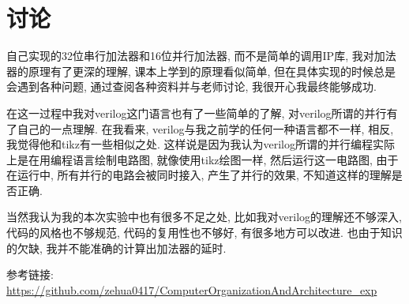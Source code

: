 \documentclass[AutoFakeBold]{LZUThesis}
\begin{document}
\section{讨论}
自己实现的32位串行加法器和16位并行加法器, 而不是简单的调用IP库, 我对加法器的原理有了更深的理解, 课本上学到的原理看似简单, 但在具体实现的时候总是会遇到各种问题, 
通过查阅各种资料并与老师讨论, 我很开心我最终能够成功.

在这一过程中我对verilog这门语言也有了一些简单的了解, 对verilog所谓的并行有了自己的一点理解. 
在我看来, verilog与我之前学的任何一种语言都不一样, 相反, 我觉得他和tikz有一些相似之处. 
这样说是因为我认为verilog所谓的并行编程实际上是在用编程语言绘制电路图, 就像使用tikz绘图一样,
然后运行这一电路图, 由于在运行中, 所有并行的电路会被同时接入, 产生了并行的效果, 不知道这样的理解是否正确.

当然我认为我的本次实验中也有很多不足之处, 比如我对verilog的理解还不够深入, 代码的风格也不够规范, 代码的复用性也不够好, 有很多地方可以改进.
也由于知识的欠缺, 我并不能准确的计算出加法器的延时.
\backmatter





\Appendix
参考链接:
\url{https://github.com/zehua0417/ComputerOrganizationAndArchitecture_exp}



\end{document}
